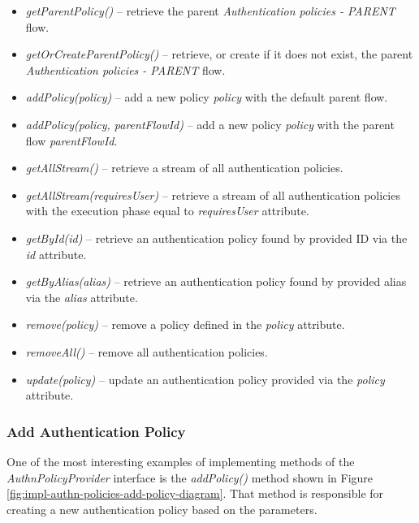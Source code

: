 \begin{itemize}
    \item \textit{getParentPolicy()} -- retrieve the parent \textit{Authentication policies - PARENT} flow.
    \item \textit{getOrCreateParentPolicy()} -- retrieve, or create if it does not exist, the parent \textit{Authentication policies - PARENT} flow.
    \item \textit{addPolicy(policy)} -- add a new policy \textit{policy} with the default parent flow.
    \item \textit{addPolicy(policy, parentFlowId)} -- add a new policy \textit{policy} with the parent flow \textit{parentFlowId}.
    \item \textit{getAllStream()} -- retrieve a stream of all authentication policies.
    \item \textit{getAllStream(requiresUser)} -- retrieve a stream of all authentication policies with the execution phase equal to \textit{requiresUser} attribute.
    \item \textit{getById(id)} -- retrieve an authentication policy found by provided ID via the \textit{id} attribute.
    \item \textit{getByAlias(alias)} -- retrieve an authentication policy found by provided alias via the \textit{alias} attribute.
    \item \textit{remove(policy)} -- remove a policy defined in the \textit{policy} attribute.
    \item \textit{removeAll()} -- remove all authentication policies.
    \item \textit{update(policy)} -- update an authentication policy provided via the \textit{policy} attribute.
\end{itemize}

\newpage

\subsubsection{Add Authentication Policy}
One of the most interesting examples of implementing methods of the \textit{AuthnPolicyProvider} interface is the \textit{addPolicy()} method shown in Figure \ref{fig:impl-authn-policies-add-policy-diagram}.
That method is responsible for creating a new authentication policy based on the parameters.

